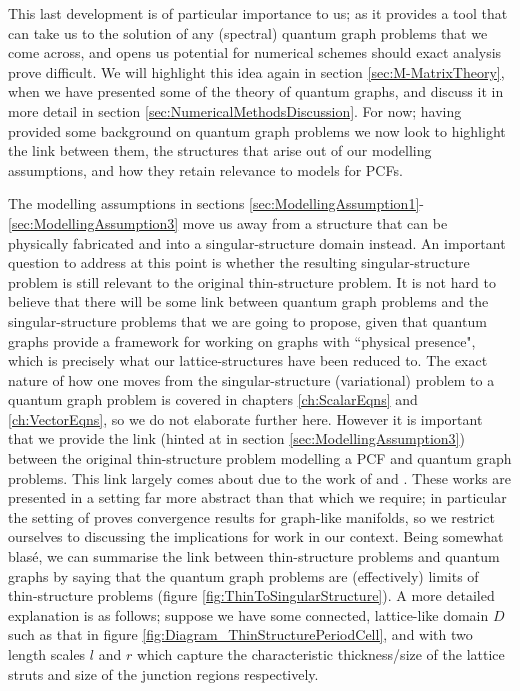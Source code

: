 This last development is of particular importance to us; as it provides a tool that can take us to the solution of any (spectral) quantum graph problems that we come across, and opens us potential for numerical schemes should exact analysis prove difficult.
We will highlight this idea again in section \ref{sec:M-MatrixTheory}, when we have presented some of the theory of quantum graphs, and discuss it in more detail in section \ref{sec:NumericalMethodsDiscussion}.
For now; having provided some background on quantum graph problems we now look to highlight the link between them, the structures that arise out of our modelling assumptions, and how they retain relevance to models for PCFs. \newline

The modelling assumptions in sections \ref{sec:ModellingAssumption1}-\ref{sec:ModellingAssumption3} move us away from a structure that can be physically fabricated and into a singular-structure domain instead.
An important question to address at this point is whether the resulting singular-structure problem is still relevant to the original thin-structure problem.
It is not hard to believe that there will be some link between quantum graph problems and the singular-structure problems that we are going to propose, given that quantum graphs provide a framework for working on graphs with ``physical presence", which is precisely what our lattice-structures have been reduced to.
The exact nature of how one moves from the singular-structure (variational) problem to a quantum graph problem is covered in chapters \ref{ch:ScalarEqns} and \ref{ch:VectorEqns}, so we do not elaborate further here.
However it is important that we provide the link (hinted at in section \ref{sec:ModellingAssumption3}) between the original thin-structure problem modelling a PCF and quantum graph problems.
This link largely comes about due to the work of \cite{exner2005convergence} and .
These works are presented in a setting far more abstract than that which we require; in particular the setting of \cite{exner2005convergence} proves convergence results for graph-like manifolds, so we restrict ourselves to discussing the implications for work in our context.
Being somewhat blas\'e, we can summarise the link between thin-structure problems and quantum graphs by saying that the quantum graph problems are (effectively) limits of thin-structure problems (figure \ref{fig:ThinToSingularStructure}).
A more detailed explanation is as follows; suppose we have some connected, lattice-like domain $D$ such as that in figure \ref{fig:Diagram_ThinStructurePeriodCell}, and with two length scales $l$ and $r$ which capture the characteristic thickness/size of the lattice struts and size of the junction regions respectively.
